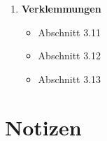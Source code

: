 \begin{tcolorbox}[colback=white!20,color=white]
\begin{enumerate}
        \item \textbf{Verklemmungen}
        \begin{itemize}
            \item[] Abschnitt 3.11
            \item[] Abschnitt 3.12
            \item[] Abschnitt 3.13
        \end{itemize}

    \end{enumerate}
\end{tcolorbox}

\newpage





\newpage
\section*{Notizen}

\newpage
